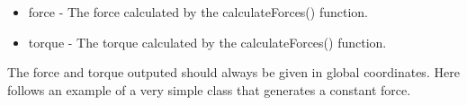 \begin{itemize}
\item force - The force calculated by the calculateForces() function.
\item torque - The torque calculated by the calculateForces() function.
\end{itemize}

The force and torque outputed should always be given in global coordinates.
Here follows an example of a very simple class that generates a constant force.


